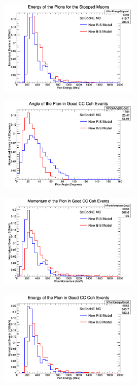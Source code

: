 \documentclass[11pt]{article}
\begin{document}
\begin{figure}[H]
\centering
\includegraphics[width=0.6\textwidth]{ANMPionPlottingImages/6-ANMPionPlotting.png}
\caption{}
\end{figure}

\begin{figure}[H]
\centering
\includegraphics[width=0.6\textwidth]{ANMPionPlottingImages/7-ANMPionPlotting.png}
\caption{}
\end{figure}

\begin{figure}[H]
\centering
\includegraphics[width=0.6\textwidth]{ANMPionPlottingImages/8-ANMPionPlotting.png}
\caption{}
\end{figure}

\begin{figure}[H]
\centering
\includegraphics[width=0.6\textwidth]{ANMPionPlottingImages/9-ANMPionPlotting.png}
\caption{}
\end{figure}
\end{document}
